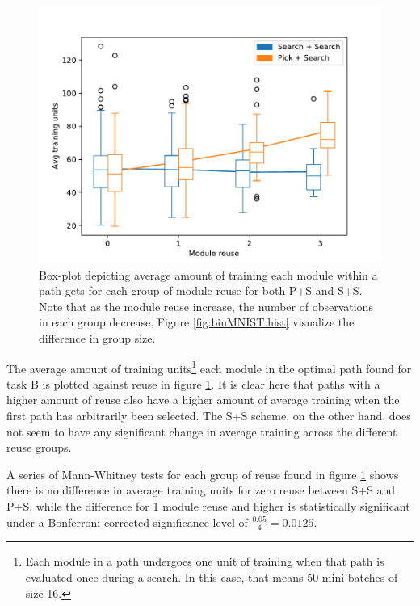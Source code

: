 \begin{figure}[t]
    \includegraphics[width=\textwidth]{Chapters/4.Experiments/exp1/figures/BIN_training_boxplot.pdf}
    \caption[Training boxplot for binary MNIST classification]{Box-plot depicting average amount of training each module within a path gets for each group of module reuse for both P+S and S+S. Note that as the module reuse increase, the number of observations in each group decrease. Figure \ref{fig:binMNIST.hist} visualize the difference in group size.}
    \label{fig:binMNIST.box}
\end{figure}

The average amount of training units\footnote{Each module in a path undergoes one unit of training when that path is evaluated once during a search. In this case, that means 50 mini-batches of size 16.} each module in the optimal path found for task B is plotted against reuse in figure \ref{fig:binMNIST.box}. It is clear here that paths with a higher amount of reuse also have a higher amount of average training when the first path has arbitrarily been selected. The S+S scheme, on the other hand, does not seem to have any significant change in average training across the different reuse groups. 

A series of Mann-Whitney tests for each group of reuse found in figure \ref{fig:binMNIST.box} shows there is no difference in average training units for zero reuse between S+S and P+S, while the difference for 1 module reuse and higher is statistically significant under a Bonferroni corrected significance level of \(\frac{0.05}{4}=0.0125\).

